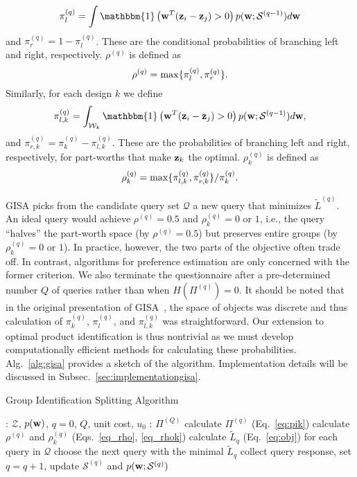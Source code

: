 \documentclass[onecolumn,11pt]{article}
\newcommand{\cutequationup}{\vspace*{-0.12in}}
\newcommand{\cutequationdown}{\vspace*{-0.12in}}
\newcommand{\cutequationup}{}
\newcommand{\cutequationdown}{}
\begin{document}
\begin{equation}
\pi_{l}^{(q)} = \int \mathbbm{1}\left({\bf w}^T({\bf z}_{i}-{\bf
z}_{j})>0\right) p({\bf w};\mathcal{S}^{(q-1)})d{\bf w}
\end{equation}
and $\pi_{r}^{(q)} = 1-\pi_{l}^{(q)}$. These are the conditional probabilities of branching left and right, respectively. $\rho^{(q)}$ is defined as
\cutequationup
\begin{equation}
\rho^{(q)}=\max\{\pi_{l}^{(q)},\pi_{r}^{(q)}\}.
\label{eq_rho}
\cutequationdown
\end{equation}
Similarly, for each design $k$ we define 
\begin{equation}
\pi_{l,k}^{(q)} = \int_{\mathcal{W}_k} \mathbbm{1}\left({\bf w}^T({\bf z}_{i}-{\bf
z}_{j})>0\right) p({\bf w};\mathcal{S}^{(q-1)})d{\bf
w},
\end{equation}
and $\pi_{r,k}^{(q)} = \pi_{k}^{(q)}-\pi_{l,k}^{(q)}$. These are the probabilities of branching left and right, respectively, for part-worths that make ${\bf z}_k$ the optimal. $\rho_{k}^{(q)}$ is defined as
\cutequationup
\begin{equation}
\rho_{k}^{(q)}=\max\{\pi_{l,k}^{(q)},\pi_{r,k}^{(q)}\}/\pi_{k}^{(q)}.
\label{eq_rhok}
\cutequationdown
\end{equation}

GISA picks from the candidate query set $\mathcal{Q}$ a new query that minimizes $\tilde{L}^{(q)}$. An ideal query would achieve $\rho^{(q)}=0.5$ and $\rho_{k}^{(q)}= 0$ or $1$, i.e., the query ``halves'' the part-worth space (by $\rho^{(q)}=0.5$) but preserves entire groups (by $\rho_{k}^{(q)}= 0$ or $1$). In practice, however, the two parts of the objective often trade off. In contrast, algorithms for preference estimation are only concerned with the former criterion. We also terminate the questionnaire after a pre-determined number $Q$ of queries rather than when $H(\Pi^{(q)})=0$. It should be noted that in the original presentation of GISA~\cite{bellala2012group}, the space of objects was discrete and thus calculation of $\pi_k^{(q)}$, $\pi_l^{(q)}$, and $\pi_{l,k}^{(q)}$ was straightforward. Our extension to optimal product identification is thus nontrivial as we must develop computationally efficient methods for calculating these probabilities. 
Alg.~\ref{alg:gisa} provides a sketch of the algorithm. Implementation details will be discussed in Subsec.~\ref{sec:implementationgisa}. 

\begin{algorithm}
\caption{Group Identification Splitting Algorithm}\label{alg:gisa}
\begin{algorithmic}[1]
: $\mathcal{Z}$, $p({\bf w})$, $q=0$, $Q$, unit cost, $u_0$
: $\Pi^{(Q)}$
\State calculate $\Pi^{(q)}$ (Eq.~\eqref{eq:pik})
\State calculate $\rho^{(q)}$ and $\rho_{k}^{(q)}$ (Eqs.~\eqref{eq_rho}, \eqref{eq_rhok})
\State calculate $\tilde{L}_q$ (Eq.~\eqref{eq:obj}) for each query in $\mathcal{Q}$
\State choose the next query with the minimal $\tilde{L}_q$
\State collect query response, set $q=q+1$, update $\mathcal{S}^{(q)}$ and $p({\bf w};\mathcal{S}^{(q)})$
\EndWhile
\end{algorithmic}
\end{algorithm}
\end{document}
